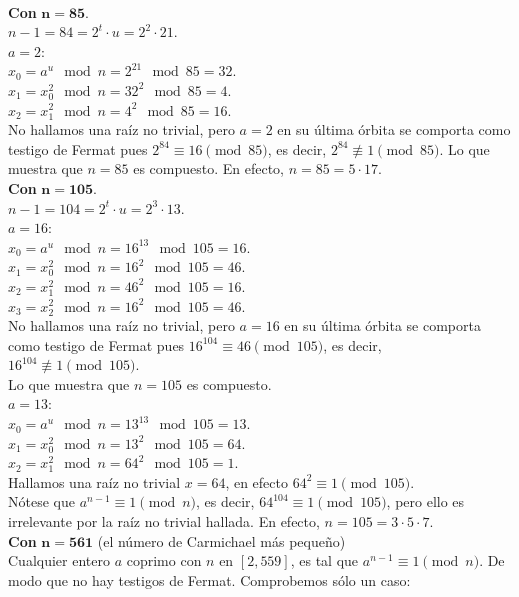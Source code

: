 \begin{ejemplo} \, \\
\textbf{Con} $\boldsymbol{n=85}$. \\
$n-1 = 84 = 2^t \cdot u = 2^2 \cdot 21$. \\
$a=2$: \\
$x_0 = a^{u} \mod n =2^{21} \mod 85 = 32$. \\
$x_1 = x_0^2 \mod n = 32^2 \mod 85 = 4$. \\
$x_2 = x_1^2 \mod n = 4^2 \mod 85 = 16$. \\
No hallamos una raíz no trivial, pero $a=2$ en su última órbita se comporta como testigo de Fermat pues $2^{84} \equiv 16 \pmod {85}$, es decir, $2^{84} \not\equiv 1 \pmod {85}$. Lo que muestra que $n=85$ es compuesto. En efecto, $n=85=5 \cdot 17$.  \\
\textbf{Con} $\boldsymbol{n=105}$. \\
$n-1 = 104 = 2^t \cdot u = 2^3 \cdot 13$. \\
$a=16$: \\
$x_0 = a^{u} \mod n =16^{13} \mod 105 = 16$. \\
$x_1 = x_0^2 \mod n = 16^2 \mod 105 = 46$. \\
$x_2 = x_1^2 \mod n = 46^2 \mod 105 = 16$. \\
$x_3 = x_2^2 \mod n = 16^2 \mod 105 = 46$. \\
No hallamos una raíz no trivial, pero $a=16$ en su última órbita se comporta como testigo de Fermat pues $16^{104} \equiv 46 \pmod {105}$, es decir, $16^{104} \not\equiv 1 \pmod {105}$. \\
Lo que muestra que $n=105$ es compuesto. \\
$a=13$: \\
$x_0 = a^{u} \mod n =13^{13} \mod 105 = 13$. \\
$x_1 = x_0^2 \mod n = 13^2 \mod 105 = 64$. \\
$x_2 = x_1^2 \mod n = 64^2 \mod 105 = 1$. \\
Hallamos una raíz no trivial $x=64$, en efecto $64^2 \equiv 1 \pmod {105}$. \\
Nótese que $a^{n-1} \equiv 1 \pmod n$, es decir, $64^{104} \equiv 1 \pmod {105}$, pero ello es irrelevante por la raíz no trivial hallada. En efecto, $n=105=3 \cdot 5 \cdot 7$. \\
\textbf{Con} $\boldsymbol{n=561}$ \quad (el número de Carmichael más pequeño) \\
Cualquier entero $a$ coprimo con $n$ en $[2,559]$, es tal que $a^{n-1} \equiv 1 \pmod n$. De modo que no hay testigos de Fermat. Comprobemos sólo un caso: \\

\end{ejemplo}
